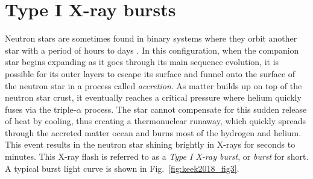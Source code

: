 \documentclass[../main.tex]{subfiles}
\begin{document}
 
 
 
\section{Type I X-ray bursts}\label{section:type_I_xray_bursts}
Neutron stars are sometimes found in binary systems where they orbit another star with a period of hours to days \citep{Lewin1993}. In this configuration, when the companion star begins expanding as it goes through its main sequence evolution, it is possible for its outer layers to escape its surface and funnel onto the surface of the neutron star in a process called \textit{accretion}.  As matter builds up on top of the neutron star crust, it eventually reaches a critical pressure where helium quickly fuses via the triple-$\alpha$ process.  The star cannot compensate for this sudden release of heat by cooling, thus creating a thermonuclear runaway, which quickly spreads through the accreted matter ocean and burns most of the hydrogen and helium. This event results in the neutron star shining brightly in X-rays for seconds to minutes. This X-ray flash is referred to as a \textit{Type I X-ray burst}, or \textit{burst} for short. A typical burst light curve is shown in Fig.~\ref{fig:keek2018_fig3}. 
\end{document}

